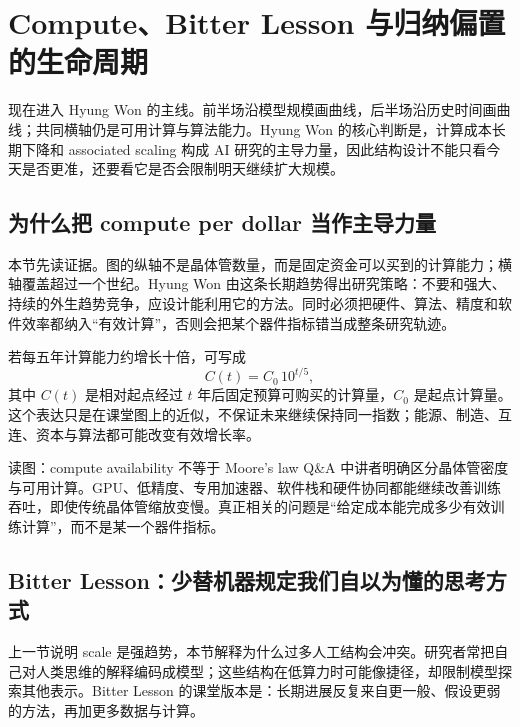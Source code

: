 \section{Compute、Bitter Lesson 与归纳偏置的生命周期}

现在进入 Hyung Won 的主线。前半场沿模型规模画曲线，后半场沿历史时间画曲线；共同横轴仍是可用计算与算法能力。Hyung Won 的核心判断是，计算成本长期下降和 associated scaling 构成 AI 研究的主导力量，因此结构设计不能只看今天是否更准，还要看它是否会限制明天继续扩大规模。

\subsection{为什么把 compute per dollar 当作主导力量}

本节先读证据。图的纵轴不是晶体管数量，而是固定资金可以买到的计算能力；横轴覆盖超过一个世纪。Hyung Won 由这条长期趋势得出研究策略：不要和强大、持续的外生趋势竞争，应设计能利用它的方法。同时必须把硬件、算法、精度和软件效率都纳入“有效计算”，否则会把某个器件指标错当成整条研究轨迹。


若每五年计算能力约增长十倍，可写成
\[
C(t)=C_0\,10^{t/5},
\]
其中 $C(t)$ 是相对起点经过 $t$ 年后固定预算可购买的计算量，$C_0$ 是起点计算量。这个表达只是在课堂图上的近似，不保证未来继续保持同一指数；能源、制造、互连、资本与算法都可能改变有效增长率。

\begin{knowledgebox}{读图：compute availability 不等于 Moore's law}
Q\&A 中讲者明确区分晶体管密度与可用计算。GPU、低精度、专用加速器、软件栈和硬件协同都能继续改善训练吞吐，即使传统晶体管缩放变慢。真正相关的问题是“给定成本能完成多少有效训练计算”，而不是某一个器件指标。
\end{knowledgebox}


\subsection{Bitter Lesson：少替机器规定我们自以为懂的思考方式}

上一节说明 scale 是强趋势，本节解释为什么过多人工结构会冲突。研究者常把自己对人类思维的解释编码成模型；这些结构在低算力时可能像捷径，却限制模型探索其他表示。Bitter Lesson 的课堂版本是：长期进展反复来自更一般、假设更弱的方法，再加更多数据与计算。

